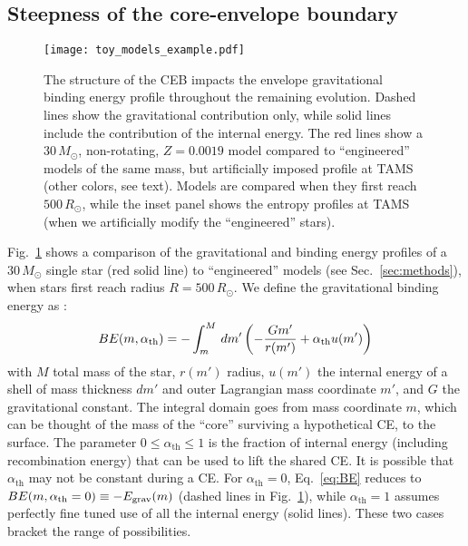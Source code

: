 \documentclass[twocolumn,twocolappendix,trackchanges]{aastex63}
\DeclareRobustCommand{\Eqref}[1]{Eq.~\ref{#1}}
\DeclareRobustCommand{\Figref}[1]{Fig.~\ref{#1}}
\DeclareRobustCommand{\Secref}[1]{Sec.~\ref{#1}}
\begin{document}
\subsection{Steepness of the core-envelope boundary}
\label{sec:eng_examples}


\begin{figure}[bp]
  \centering
  \texttt{[image: toy\_models\_example.pdf]}
  \caption{The structure of the CEB impacts the envelope gravitational
    binding energy profile throughout the remaining evolution. Dashed
    lines show the gravitational contribution only, while solid lines
    include the contribution of the internal energy. The red lines
    show a $30\,M_\odot$, non-rotating, $Z=0.0019$ model compared to
    ``engineered'' models of the same mass, but artificially imposed
    profile at TAMS (other colors, see text). Models are compared when
    they first reach $500\,R_\odot$, while the inset panel shows the
    entropy profiles at TAMS (when we artificially modify the
    ``engineered'' stars).}
  \label{fig:toy_models_example}
\end{figure}


\Figref{fig:toy_models_example} shows a comparison of the
gravitational and binding energy profiles of a $30\,M_\odot$ single
star (red solid line) to
``engineered'' models (see \Secref{sec:methods}), when stars first
reach radius $R=500\,R_\odot$. We
define the gravitational binding energy as
\citep[e.g.,][]{dekool:1990, dewi:2000, lau:2022}:
\begin{equation}
  \label{eq:BE}
BE(m, \alpha_{\rm th}) = - \int_{m}^M\,dm'\left( -\frac{G m'}{r(m')}+\alpha_\mathrm{th} u(m')\right)
\end{equation}
with $M$ total mass of the star, $r(m')$ radius, $u(m')$ the internal
energy of a shell of mass thickness $dm'$ and outer Lagrangian mass
coordinate $m'$, and $G$ the gravitational constant. The integral
domain goes from mass coordinate $m$, which can be thought of the mass
of the ``core'' surviving a hypothetical CE, to the surface. The
parameter $0\leq \alpha_\mathrm{th}\leq 1$ is the fraction of internal
energy (including recombination energy) that can be used to lift the
shared CE. It is possible that $\alpha_\mathrm{th}$ may not be
constant during a CE. For $\alpha_\mathrm{th}=0$, \Eqref{eq:BE}
reduces to $BE(m, \alpha_{\rm th}=0)\equiv -E_\mathrm{grav}(m)$
(dashed lines in \Figref{fig:toy_models_example}), while
$\alpha_{\mathrm{th}}=1$ assumes perfectly fine tuned use of all the
internal energy (solid lines). These two cases bracket the range of possibilities.
\end{document}
